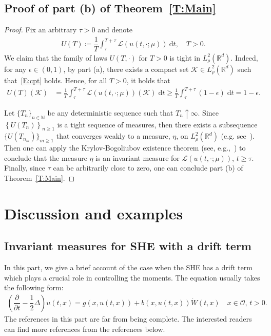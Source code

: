 \documentclass[sn-mathphys]{sn-jnl}%
\newcommand{\BR}{\mathbb{R}}
\newcommand{\ud}{\ensuremath{\mathrm{d}}}
\numberwithin{equation}{section}
\theoremstyle{thmstyleone}%
\theoremstyle{thmstyletwo}%
\theoremstyle{thmstylethree}%
\begin{document}
\subsection{Proof of part (b) of Theorem~\ref{T:Main}}
\begin{proof}
  Fix an arbitrary $\tau>0$ and denote
  \begin{align*}
    U(T) \coloneqq \dfrac{1}{T}\int_{\tau}^{T+\tau} \mathcal{L}\left(u(t,\cdot;\mu)\right)\: \ud t, \quad T>0.
  \end{align*}
  We claim that the family of laws $U(T,\cdot)$ for $T > 0$ is tight in $L^2_{\rho}(\BR^d)$. Indeed,
  for any $\epsilon\in (0,1)$, by part (a), there exists a compact set $\mathcal{K}\in L_\rho^2
  (\BR^d)$ such that~\eqref{E:cpt} holds. Hence, for all $T>0$, it holds that
  \begin{align*}
    U(T)\left(\mathcal{K}\right)
    & = \frac{1}{T} \int_{\tau}^{T + \tau} \mathscr{L}(u(t,\cdot;\mu))\left(\mathcal{K}\right) \; \ud t
      \ge \frac{1}{T} \int_{\tau}^{T + \tau} (1-\epsilon) \; \ud t
      = 1-\epsilon.
  \end{align*}

  Let $\{T_n\}_{n\in \mathbb{N}}$ be any deterministic sequence such that $T_n\uparrow \infty$.
  Since $\left\{U(T_n)\right\}_{n\ge 1}$ is a tight sequence of measures, then there exists a
  subsequence $\{U\left(T_{n_m}\right)\}_{m\ge 1}$ that converges weakly to a measure, $\eta$, on
  $L_\rho^2 (\BR^d)$ (e.g. see~\cite[Theorem 5.1]{billingsley:99:convergence}). Then one can apply
  the Krylov-Bogoliubov existence theorem (see, e.g.,~\cite[Theorem
  11.7]{da-prato.zabczyk:14:stochastic}) to conclude that the measure $\eta$ is an invariant measure
  for $\mathscr{L}(u(t,\cdot;\mu))$, $t\ge \tau$. Finally, since $\tau$ can be arbitrarily close to
  zero, one can conclude part (b) of Theorem~\ref{T:Main}.
\end{proof}


\section{Discussion and examples}\label{S:Example}
\subsection{Invariant measures for SHE with a drift term}\label{SS:Drift}

In this part, we give a brief account of the case when the SHE has a drift term which plays a
crucial role in controlling the moments. The equation usually takes the following form:
\begin{align}\label{E:Drift}
  \left(\dfrac{\partial}{\partial t}-\dfrac{1}{2}\Delta\right) u(t,x)
   = g(x,u(t,x)) + b(x,u(t,x)) \dot W(t,x) \quad \text{$x\in \mathcal{O}$, $t>0$}.
\end{align}
The references in this part are far from being complete. The interested readers can find more
references from the references below.
\end{document}
